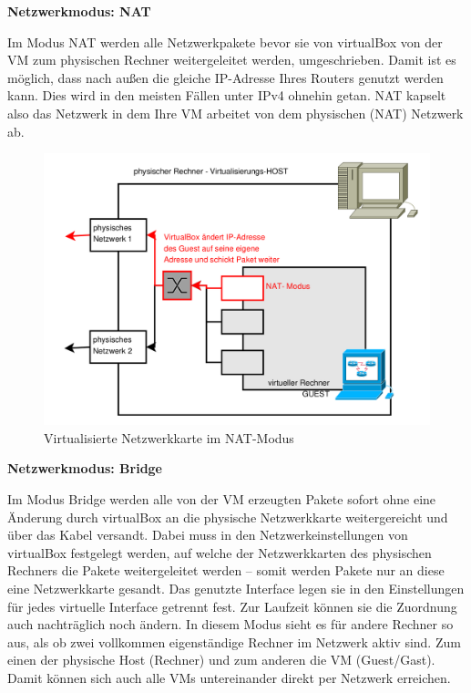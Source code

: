 \documentclass[paper=a4,fontsize=11pt]{scrartcl}%
\numberwithin{equation}{section}
\begin{document}
\begin{center}
\Large{\textbf{Netzwerkmodus: NAT}}
\end{center}
Im Modus NAT werden alle Netzwerkpakete bevor sie von virtualBox von der VM zum physischen Rechner weitergeleitet werden, umgeschrieben. Damit ist es möglich, dass nach außen die gleiche IP-Adresse Ihres Routers genutzt werden kann. Dies wird in den meisten Fällen unter IPv4 ohnehin getan. NAT kapselt also das Netzwerk in dem Ihre VM arbeitet von dem physischen (NAT) Netzwerk ab.
\begin{figure}[H]
\centering
\includegraphics[scale=0.35]{vbox5}
\caption{Virtualisierte Netzwerkkarte im NAT-Modus}
\end{figure}
\begin{center}
\Large{\textbf{Netzwerkmodus: Bridge}}
\end{center}
Im Modus Bridge werden alle von der VM erzeugten Pakete sofort ohne eine Änderung durch virtualBox an die physische Netzwerkkarte weitergereicht und über das Kabel versandt. Dabei muss in den Netzwerkeinstellungen von virtualBox festgelegt werden, auf welche der Netzwerkkarten des physischen Rechners die Pakete weitergeleitet werden -- somit werden Pakete nur an diese eine Netzwerkkarte gesandt. Das genutzte Interface legen sie in den Einstellungen für jedes virtuelle Interface getrennt fest. Zur Laufzeit können sie die Zuordnung auch nachträglich noch ändern. In diesem Modus sieht es für andere Rechner so aus, als ob zwei vollkommen eigenständige Rechner im Netzwerk aktiv sind. Zum einen der physische Host (Rechner) und zum anderen die VM (Guest/Gast). Damit können sich auch alle VMs untereinander direkt per Netzwerk erreichen.
\end{document}
